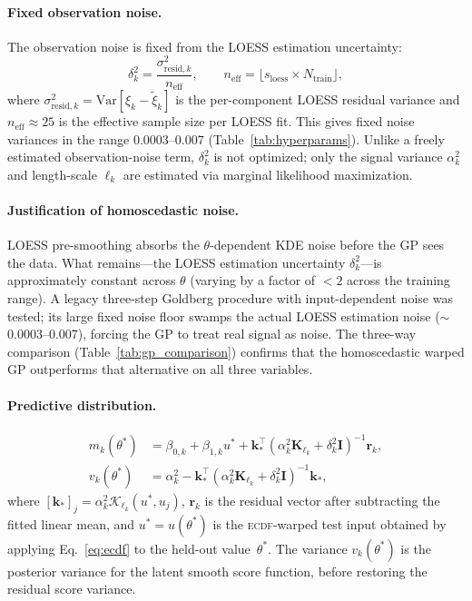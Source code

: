\documentclass[12pt,a4paper]{article}
\newcommand{\ECDF}{\textsc{ecdf}}
\newcommand{\calK}{\mathcal{K}}
\newcommand{\spar}{\theta}
\begin{document}
\paragraph{Fixed observation noise.}
The observation noise is fixed from the LOESS estimation uncertainty:
\begin{equation}
  \delta_k^2 =
  \frac{\sigma^2_{\mathrm{resid},k}}{n_\mathrm{eff}},
  \qquad n_\mathrm{eff} = \lfloor s_\mathrm{loess}\times N_\mathrm{train}\rfloor,
  \label{eq:obs_noise}
\end{equation}
where
$\sigma^2_{\mathrm{resid},k}=\mathrm{Var}[\xi_k-\tilde{\xi}_k]$
is the per-component LOESS residual variance and
$n_\mathrm{eff}\approx25$ is the effective sample size per LOESS fit.
This gives fixed noise variances in the range 0.0003--0.007
(Table~\ref{tab:hyperparams}).  Unlike a freely estimated
observation-noise term,
$\delta_k^2$ is not optimized; only the signal variance $\alpha_k^2$
and length-scale $\ell_k$ are estimated via marginal likelihood
maximization.

\paragraph{Justification of homoscedastic noise.}
LOESS pre-smoothing absorbs the $\spar$-dependent KDE noise before the
GP sees the data.  What remains---the LOESS estimation uncertainty
$\delta_k^2$---is approximately constant across $\spar$ (varying by a
factor of $<2$ across the training range).  A legacy three-step
Goldberg procedure with input-dependent noise was tested; its large
fixed noise floor swamps the actual LOESS estimation noise
($\sim$0.0003--0.007), forcing the GP to treat real signal as noise.  The
three-way comparison (Table~\ref{tab:gp_comparison}) confirms that the
homoscedastic warped GP outperforms that alternative on
all three variables.

\paragraph{Predictive distribution.}
\begin{align}
  m_k(\spar^*)&=\beta_{0,k}+\beta_{1,k}u^*+
    \mathbf{k}_*^\top(\alpha_k^2\mathbf{K}_{\ell_k}+\delta_k^2\mathbf{I})^{-1}
    \mathbf{r}_k,
  \label{eq:gp_mean}\\
  v_k(\spar^*)&=\alpha_k^2
    -\mathbf{k}_*^\top(\alpha_k^2\mathbf{K}_{\ell_k}+\delta_k^2\mathbf{I})^{-1}
    \mathbf{k}_*,
  \label{eq:gp_var}
\end{align}
where $[\mathbf{k}_*]_j=\alpha_k^2\calK_{\ell_k}(u^*,u_j)$,
$\mathbf{r}_k$ is the residual vector after subtracting the fitted
linear mean, and
$u^*=u(\spar^*)$ is the \ECDF-warped test input obtained by applying
Eq.~\eqref{eq:ecdf} to the held-out value~$\spar^*$.  The variance
$v_k(\spar^*)$ is the posterior variance for the latent smooth score
function, before restoring the residual score variance.
\end{document}
